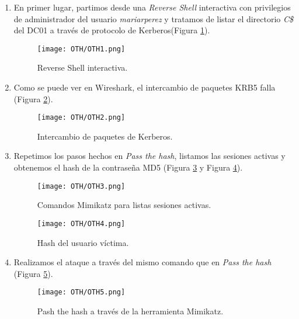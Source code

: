 \begin{enumerate}
\item En primer lugar, partimos desde una {\it Reverse Shell} interactiva con privilegios de administrador del usuario {\it mariarperez} y tratamos de listar el directorio {\it C\$} del DC01 a través de protocolo de Kerberos(Figura \ref{OTH1}).
\begin{figure}[H] %
\begin{center}
\texttt{[image: OTH/OTH1.png]}
\end{center}
\caption{Reverse Shell interactiva.}
\label{OTH1}
\end{figure}

\item Como se puede ver en Wireshark, el intercambio de paquetes KRB5 falla (Figura \ref{OTH2}).
\begin{figure}[H] %
\begin{center}
\texttt{[image: OTH/OTH2.png]}
\end{center}
\caption{Intercambio de paquetes de Kerberos.}
\label{OTH2}
\end{figure}

\item Repetimos los pasos hechos en {\it Pass the hash}, listamos las sesiones activas y obtenemos el hash de la contraseña MD5 (Figura \ref{OTH3} y Figura \ref{OTH4}).
\begin{figure}[H] %
\begin{center}
\texttt{[image: OTH/OTH3.png]}
\end{center}
\caption{Comandos Mimikatz para listas sesiones activas.}
\label{OTH3}
\end{figure}

\begin{figure}[H] %
\begin{center}
\texttt{[image: OTH/OTH4.png]}
\end{center}
\caption{Hash del usuario víctima.}
\label{OTH4}
\end{figure}

\item Realizamos el ataque a través del mismo comando que en {\it Pass the hash} (Figura \ref{OTH5}).
\begin{figure}[H] %
\begin{center}
\texttt{[image: OTH/OTH5.png]}
\end{center}
\caption{Pash the hash a través de la herramienta Mimikatz.}
\label{OTH5}
\end{figure}


\end{enumerate}
